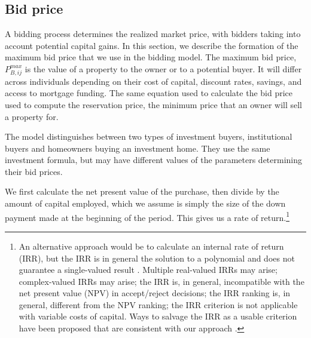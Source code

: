 {%


\subsection{Bid price}\label{sec:bid-price}
A bidding process determines the realized market price, with bidders taking into account potential capital gains. In this section, we describe the formation of the maximum bid price that we use  in the bidding model. The maximum \gls{bid price}, $P_{B,ij}^{max}$ %
is the value of a property to the owner or to a potential buyer. It will differ across individuals depending on their cost of capital, discount rates,  savings, and access to mortgage funding. The same equation used to calculate the bid price used to compute the \gls{reservation price}, the minimum price that an owner will sell a property for. 

The model distinguishes between two types of investment buyers, institutional buyers and homeowners buying an investment home. They use the same investment formula, but may have different values of the parameters determining their bid prices.

We first calculate the net present value of the purchase, then divide by the amount of capital employed, which we assume is simply the size of the down payment made at the beginning of the period. This gives us a rate of return.\footnote{An alternative approach would be to calculate an \gls{internal rate of return} (IRR), but the IRR is in general the solution to a polynomial and does not guarantee a single-valued result \cite{robinsonOptimalTerminationIRR1996}. Multiple real-valued  IRRs may arise;  complex-valued IRRs may arise;  the IRR is, in general, incompatible with the \gls{net present value} (NPV) in accept/reject decisions; the IRR ranking is, in general, different from the NPV ranking; the IRR criterion is not applicable with variable costs of capital. Ways to salvage the IRR as a usable criterion have been proposed that are consistent with our approach \cite{magniAverageInternalRate2010}.}


}
